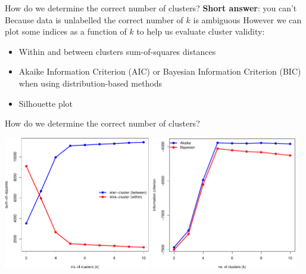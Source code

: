\documentclass[pdf]{beamer}
\begin{document}
\begin{frame}{How do we determine the correct number of clusters?}
\textbf{Short answer}: you can't
\vfill
Because data is unlabelled the correct number of $k$ is ambiguous
\vfill
However we can plot some indices as a function of $k$ to help us evaluate cluster validity:
\vfill
\begin{itemize}\addtolength{\itemsep}{0.8\baselineskip}
	\item Within and between clusters sum-of-squares distances
	\item Akaike Information Criterion (AIC) or Bayesian Information Criterion (BIC) when using distribution-based methods
	\item Silhouette plot %
\end{itemize}
\end{frame}
\begin{frame}{How do we determine the correct number of clusters?}
\begin{center}
	\includegraphics[width=0.48\textwidth]{sumOfSquares.pdf}\hfill	
	\includegraphics[width=0.48\textwidth]{infoCriterion.pdf}
\end{center}
\end{frame}
\end{document}
